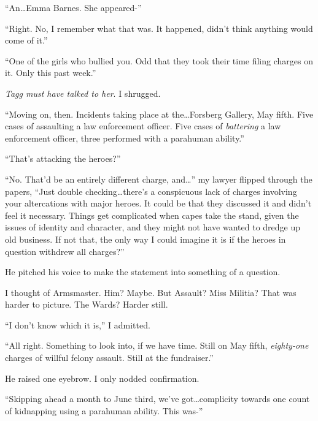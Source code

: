 ``An\ldots Emma Barnes.  She appeared-''



``Right.  No, I remember what that was.  It happened, didn't think anything would come of it.''



``One of the girls who bullied you.  Odd that they took their time filing charges on it.  Only this past week.''



\emph{Tagg must have talked to her}.  I shrugged.



``Moving on, then.  Incidents taking place at the\ldots Forsberg Gallery, May fifth.  Five cases of assaulting a law enforcement officer.  Five cases of \emph{battering} a law enforcement officer, three performed with a parahuman ability.''



``That's attacking the heroes?''



``No.  That'd be an entirely different charge, and\ldots'' my lawyer flipped through the papers, ``Just double checking\ldots there's a conspicuous lack of charges involving your altercations with major heroes.  It could be that they discussed it and didn't feel it necessary.  Things get complicated when capes take the stand, given the issues of identity and character, and they might not have wanted to dredge up old business.  If not that, the only way I could imagine it is if the heroes in question withdrew all charges?''



He pitched his voice to make the statement into something of a question.



I thought of Armsmaster.  Him?  Maybe.  But Assault?  Miss Militia?  That was harder to picture.  The Wards?  Harder still.



``I don't know which it is,'' I admitted.



``All right.  Something to look into, if we have time.  Still on May fifth, \emph{eighty-one }charges of willful felony assault.  Still at the fundraiser.''



He raised one eyebrow.  I only nodded confirmation.



``Skipping ahead a month to June third, we've got\ldots complicity towards one count of kidnapping using a parahuman ability.  This was-''



